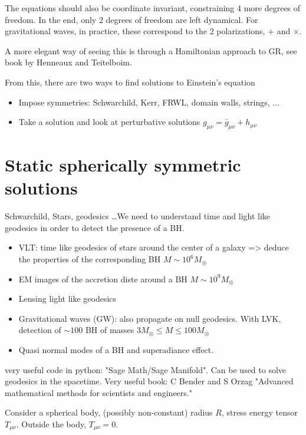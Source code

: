 \documentclass[a4paper]{book}
\theoremstyle{definition}
\theoremstyle{remark}
\begin{document}
The equations should also be coordinate invariant, constraining 4 more degrees of freedom. In the end, only 2 degrees of freedom are left dynamical. For gravitational waves, in practice, these correspond to the 2 polarizations, $+$ and $\times$. 

A more elegant way of seeing this is through a Hamiltonian approach to GR, see book by Henneaux and Teitelboim.\par\medskip 

From this, there are two ways to find solutions to Einstein's equation  

\begin{itemize}
    \item Impose symmetries: Schwarchild, Kerr, FRWL, domain walls, strings, ...
    \item Take a solution and look at perturbative solutions $g_{\mu\nu} = \bar{g}_{\mu\nu} + h_{\mu\nu}$
\end{itemize}

\section{Static spherically symmetric solutions}
Schwarchild, Stars, geodesics \dots We need to understand time and light like geodesics in order to detect the presence of a BH. 

\begin{itemize}
    \item VLT: time like geodesics of stars around the center of a galaxy => deduce the properties of the corresponding BH $M \sim 10^6 M_{\circledcirc}$
    \item EM images of the accretion diste around a BH $M \sim 10^9 M_{\circledcirc}$
    \item Lensing light like geodesics
    \item Gravitational waves (GW): also propagate on null geodesics. With LVK, detection of $\sim 100$ BH of masses $3M_{\circledcirc} \leq M \leq 100M_{\circledcirc}$
    \item Quasi normal modes of a BH and superadiance effect. 
\end{itemize}

very useful code in python: "Sage Math/Sage Manifold". Can be used to solve geodesics in the spacetime. Very useful book: C Bender and S Orzag "Advanced mathematical methods for scientists and engineers." \par \medskip 

Consider a spherical body, (possibly non-constant) radius $R$, stress energy tensor $T_{\mu\nu}$. Outside the body, $T_{\mu\nu} = 0$. \par \bigskip 
\end{document}
